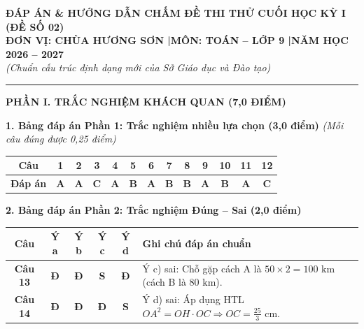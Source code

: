 \documentclass[11pt,a4paper]{article}
\begin{document}
\begin{center}
{\large\bfseries ĐÁP ÁN \& HƯỚNG DẪN CHẤM ĐỀ THI THỬ CUỐI HỌC KỲ I (ĐỀ SỐ 02)}\\[1.5mm]
{\bfseries ĐƠN VỊ: CHÙA HƯƠNG SƠN \quad|\quad MÔN: TOÁN -- LỚP 9 \quad|\quad NĂM HỌC 2026 -- 2027}\\[1mm]
\textit{(Chuẩn cấu trúc định dạng mới của Sở Giáo dục và Đào tạo)}
\end{center}

\vspace{1mm}
\hrule
\vspace{3mm}

\noindent
\textbf{\large PHẦN I. TRẮC NGHIỆM KHÁCH QUAN (7,0 ĐIỂM)}

\vspace{2mm}
\noindent
\textbf{1. Bảng đáp án Phần 1: Trắc nghiệm nhiều lựa chọn (3,0 điểm)} \textit{(Mỗi câu đúng được 0,25 điểm)}
\begin{center}
\begin{tabular}{|c|c|c|c|c|c|c|c|c|c|c|c|c|}
\hline
\textbf{Câu} & \textbf{1} & \textbf{2} & \textbf{3} & \textbf{4} & \textbf{5} & \textbf{6} & \textbf{7} & \textbf{8} & \textbf{9} & \textbf{10} & \textbf{11} & \textbf{12} \\
\hline
\textbf{Đáp án} & \textbf{A} & \textbf{A} & \textbf{C} & \textbf{A} & \textbf{B} & \textbf{A} & \textbf{B} & \textbf{B} & \textbf{A} & \textbf{B} & \textbf{A} & \textbf{C} \\
\hline
\end{tabular}
\end{center}

\vspace{2mm}
\noindent
\textbf{2. Bảng đáp án Phần 2: Trắc nghiệm Đúng -- Sai (2,0 điểm)}
\begin{center}
\begin{tabular}{|c|c|c|c|c|l|}
\hline
\textbf{Câu} & \textbf{Ý a} & \textbf{Ý b} & \textbf{Ý c} & \textbf{Ý d} & \textbf{Ghi chú đáp án chuẩn} \\
\hline
\textbf{Câu 13} & \textbf{Đ} & \textbf{Đ} & \textbf{S} & \textbf{Đ} & Ý c) sai: Chỗ gặp cách A là $50 \times 2 = 100\text{ km}$ (cách B là $80\text{ km}$). \\
\hline
\textbf{Câu 14} & \textbf{Đ} & \textbf{Đ} & \textbf{Đ} & \textbf{S} & Ý d) sai: Áp dụng HTL $OA^2 = OH \cdot OC \Rightarrow OC = \frac{25}{3}\text{ cm}$. \\
\hline
\end{tabular}
\end{center}
\end{document}
